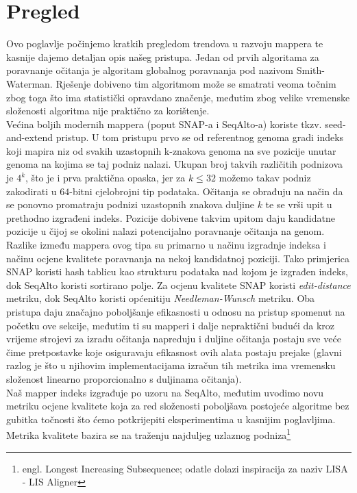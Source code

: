 \documentclass[times, utf8, diplomski]{fer}
\begin{document}
\section{Pregled}
Ovo poglavlje počinjemo kratkih pregledom trendova u razvoju mappera te kasnije dajemo detaljan opis našeg pristupa. Jedan od prvih algoritama za poravnanje očitanja je algoritam globalnog poravnanja pod nazivom Smith-Waterman\cite{Smith1981195}. Rješenje dobiveno tim algoritmom može se smatrati veoma točnim zbog toga što ima statistički opravdano značenje, međutim zbog velike vremenske složenosti algoritma nije praktično za korištenje.\\
Većina boljih modernih mappera (poput SNAP-a\cite{SNAP} i SeqAlto-a\cite{seqalto}) koriste tkzv. seed-and-extend pristup. U tom pristupu prvo se od referentnog genoma gradi indeks koji mapira niz od svakih uzastopnih k-znakova genoma na sve pozicije unutar genoma na kojima se taj podniz nalazi. Ukupan broj takvih različitih podnizova je $4^k$, što je i prva praktična opaska, jer za $k\le32$ možemo takav podniz zakodirati u $64$-bitni cjelobrojni tip podataka. Očitanja se obrađuju na način da se ponovno promatraju podnizi uzastopnih znakova duljine $k$ te se vrši upit u prethodno izgrađeni indeks. Pozicije dobivene takvim upitom daju kandidatne pozicije u čijoj se okolini nalazi potencijalno poravnanje očitanja na genom. Razlike između mappera ovog tipa su primarno u načinu izgradnje indeksa i načinu ocjene kvalitete poravnanja na nekoj kandidatnoj poziciji. Tako primjerica SNAP koristi hash tablicu kao strukturu podataka nad kojom je izgrađen indeks, dok SeqAlto koristi sortirano polje. Za ocjenu kvalitete SNAP koristi \emph{edit-distance} metriku, dok SeqAlto koristi općenitiju \emph{Needleman-Wunsch} metriku. Oba pristupa daju značajno poboljšanje efikasnosti u odnosu na pristup spomenut na početku ove sekcije, međutim ti su mapperi i dalje nepraktični budući da kroz vrijeme strojevi za izradu očitanja napreduju i duljine očitanja postaju sve veće čime pretpostavke koje osiguravaju efikasnost ovih alata postaju prejake (glavni razlog je što u njihovim implementacijama izračun tih metrika ima vremensku složenost linearno proporcionalno s duljinama očitanja).\\
Naš mapper indeks izgrađuje po uzoru na SeqAlto, međutim uvodimo novu metriku ocjene kvalitete koja za red složenosti poboljšava postojeće algoritme bez gubitka točnosti što ćemo potkrijepiti eksperimentima u kasnijim poglavljima.
Metrika kvalitete bazira se na traženju najduljeg uzlaznog podniza\footnote{engl. Longest Increasing Subsequence; odatle dolazi inspiracija za naziv LISA - LIS Aligner}\\
\end{document}
